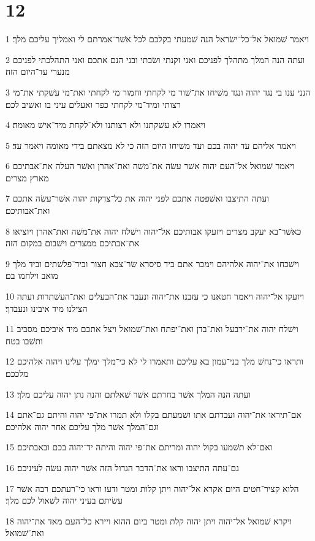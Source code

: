 \chapter{12}

\par 1 ויאמר שׁמואל אל־כל־ישׂראל הנה שׁמעתי בקלכם לכל אשׁר־אמרתם לי ואמליך עליכם מלך׃
\par 2 ועתה הנה המלך מתהלך לפניכם ואני זקנתי ושׂבתי ובני הנם אתכם ואני התהלכתי לפניכם מנערי עד־היום הזה׃
\par 3 הנני ענו בי נגד יהוה ונגד משׁיחו את־שׁור מי לקחתי וחמור מי לקחתי ואת־מי עשׁקתי את־מי רצותי ומיד־מי לקחתי כפר ואעלים עיני בו ואשׁיב לכם׃
\par 4 ויאמרו לא עשׁקתנו ולא רצותנו ולא־לקחת מיד־אישׁ מאומה׃
\par 5 ויאמר אליהם עד יהוה בכם ועד משׁיחו היום הזה כי לא מצאתם בידי מאומה ויאמר עד׃
\par 6 ויאמר שׁמואל אל־העם יהוה אשׁר עשׂה את־משׁה ואת־אהרן ואשׁר העלה את־אבתיכם מארץ מצרים׃
\par 7 ועתה התיצבו ואשׁפטה אתכם לפני יהוה את כל־צדקות יהוה אשׁר־עשׂה אתכם ואת־אבותיכם׃
\par 8 כאשׁר־בא יעקב מצרים ויזעקו אבותיכם אל־יהוה וישׁלח יהוה את־משׁה ואת־אהרן ויוציאו את־אבתיכם ממצרים וישׁבום במקום הזה׃
\par 9 וישׁכחו את־יהוה אלהיהם וימכר אתם ביד סיסרא שׂר־צבא חצור וביד־פלשׁתים וביד מלך מואב וילחמו בם׃
\par 10 ויזעקו אל־יהוה ויאמר חטאנו כי עזבנו את־יהוה ונעבד את־הבעלים ואת־העשׁתרות ועתה הצילנו מיד איבינו ונעבדך׃
\par 11 וישׁלח יהוה את־ירבעל ואת־בדן ואת־יפתח ואת־שׁמואל ויצל אתכם מיד איביכם מסביב ותשׁבו בטח׃
\par 12 ותראו כי־נחשׁ מלך בני־עמון בא עליכם ותאמרו לי לא כי־מלך ימלך עלינו ויהוה אלהיכם מלככם׃
\par 13 ועתה הנה המלך אשׁר בחרתם אשׁר שׁאלתם והנה נתן יהוה עליכם מלך׃
\par 14 אם־תיראו את־יהוה ועבדתם אתו ושׁמעתם בקלו ולא תמרו את־פי יהוה והיתם גם־אתם וגם־המלך אשׁר מלך עליכם אחר יהוה אלהיכם׃
\par 15 ואם־לא תשׁמעו בקול יהוה ומריתם את־פי יהוה והיתה יד־יהוה בכם ובאבתיכם׃
\par 16 גם־עתה התיצבו וראו את־הדבר הגדול הזה אשׁר יהוה עשׂה לעיניכם׃
\par 17 הלוא קציר־חטים היום אקרא אל־יהוה ויתן קלות ומטר ודעו וראו כי־רעתכם רבה אשׁר עשׂיתם בעיני יהוה לשׁאול לכם מלך׃
\par 18 ויקרא שׁמואל אל־יהוה ויתן יהוה קלת ומטר ביום ההוא ויירא כל־העם מאד את־יהוה ואת־שׁמואל׃
